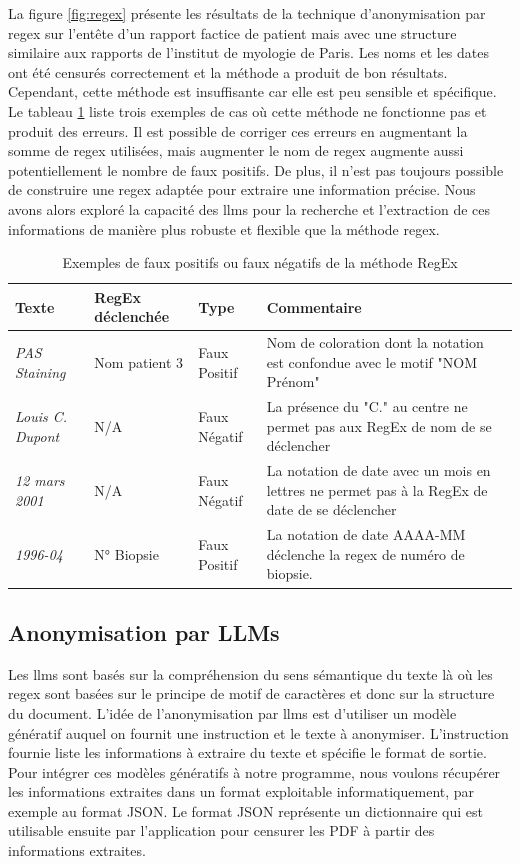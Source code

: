 La figure \ref{fig:regex} présente les résultats de la technique d'anonymisation par \gls{regex} sur l'entête d'un rapport factice de patient mais avec une structure similaire aux rapports de l'institut de myologie de Paris. Les noms et les dates ont été censurés correctement et la méthode a produit de bon résultats. Cependant, cette méthode est insuffisante car elle est peu sensible et spécifique. Le tableau \ref{tab:regex_fail} liste trois exemples de cas où cette méthode ne fonctionne pas et produit des erreurs. Il est possible de corriger ces erreurs en augmentant la somme de \gls{regex} utilisées, mais augmenter le nom de \gls{regex} augmente aussi potentiellement le nombre de faux positifs. De plus, il n'est pas toujours possible de construire une \gls{regex} adaptée pour extraire une information précise. Nous avons alors exploré la capacité des \gls{llms} pour la recherche et l'extraction de ces informations de manière plus robuste et flexible que la méthode \gls{regex}.
\begin{table}[!ht]
\centering
\caption{Exemples de faux positifs ou faux négatifs de la méthode RegEx}
\label{tab:regex_fail}
\begin{tabularx}{\textwidth}{|l|l|l|X|}
\hline
\textbf{Texte} & \textbf{RegEx déclenchée} & \textbf{Type} & \textbf{Commentaire} \\ \hline
\textit{PAS Staining} & Nom patient 3 & Faux Positif & Nom de coloration dont la notation est confondue avec le motif "NOM Prénom" \\ \hline
\textit{Louis C. Dupont} & N/A & Faux Négatif & La présence du "C." au centre ne permet pas aux RegEx de nom de se déclencher \\ \hline
\textit{12 mars 2001} & N/A & Faux Négatif & La notation de date avec un mois en lettres ne permet pas à la RegEx de date de se déclencher \\ \hline
\textit{1996-04} & N° Biopsie & Faux Positif & La notation de date AAAA-MM déclenche la \gls{regex} de numéro de biopsie. \\ \hline
\end{tabularx}
\end{table}

\subsection{Anonymisation par LLMs}
Les \gls{llms} sont basés sur la compréhension du sens sémantique du texte là où les \gls{regex} sont basées sur le principe de motif de caractères et donc sur la structure du document. L'idée de l'anonymisation par \gls{llms} est d'utiliser un modèle génératif auquel on fournit une instruction et le texte à anonymiser. L'instruction fournie liste les informations à extraire du texte et spécifie le format de sortie. Pour intégrer ces modèles génératifs à notre programme, nous voulons récupérer les informations extraites dans un format exploitable informatiquement, par exemple au format JSON. Le format JSON représente un dictionnaire qui est utilisable ensuite par l'application pour censurer les PDF à partir des informations extraites.

